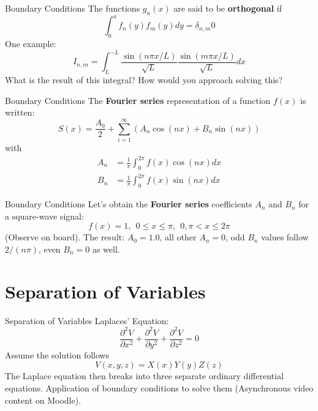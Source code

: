 \documentclass{beamer}
\begin{document}
\begin{frame}{Boundary Conditions}
The functions $g_n(x)$ are said to be \textbf{\alert{orthogonal}} if
\begin{equation}
\int_0^a f_n(y) f_m(y) dy = \delta_{n,m}0
\end{equation}
One example:
\begin{equation}
I_{n,m} = \int_L^{-L} \frac{\sin(n\pi x/L)}{\sqrt{L}}\frac{\sin(m\pi x/L)}{\sqrt{L}} dx
\end{equation}
What is the result of this integral?  How would you approach solving this?
\end{frame}

\begin{frame}{Boundary Conditions}
The \alert{\textbf{Fourier series}} representation of a function $f(x)$ is written:
\begin{equation}
S(x) = \frac{A_0}{2}+\sum_{i=1}^{\infty} \left( A_n \cos(nx) + B_n \sin(nx) \right)
\end{equation}
with
\begin{align}
A_n &= \frac{1}{\pi} \int_0^{2\pi} f(x) \cos(nx) dx \\
B_n &= \frac{1}{\pi} \int_0^{2\pi} f(x) \sin(nx) dx
\end{align}
\end{frame}

\begin{frame}{Boundary Conditions}
Let's obtain the \alert{\textbf{Fourier series}} coefficients $A_n$ and $B_n$ for a square-wave signal:
\begin{equation}
f(x) = 1, ~~ 0 \leq x \leq \pi, ~~ 0,  \pi < x \leq 2\pi 
\end{equation}
(Observe on board).  The result: $A_0 = 1.0$, all other $A_n = 0$, odd $B_n$ values follow $2/(n\pi)$, even $B_n = 0$ as well.
\end{frame}

\section{Separation of Variables}

\begin{frame}{Separation of Variables}
Laplaces' Equation:
\begin{equation}
\frac{\partial^2 V}{\partial x^2} + \frac{\partial^2 V}{\partial y^2} + \frac{\partial^2 V}{\partial z^2} = 0
\end{equation}
Assume the solution follows
\begin{equation}
V(x,y,z) = X(x) Y(y) Z(z)
\end{equation}
The Laplace equation then breaks into three separate ordinary differential equations. Application of boundary conditions to solve them (Asynchronous video content on Moodle).
\end{frame}
\end{document}
